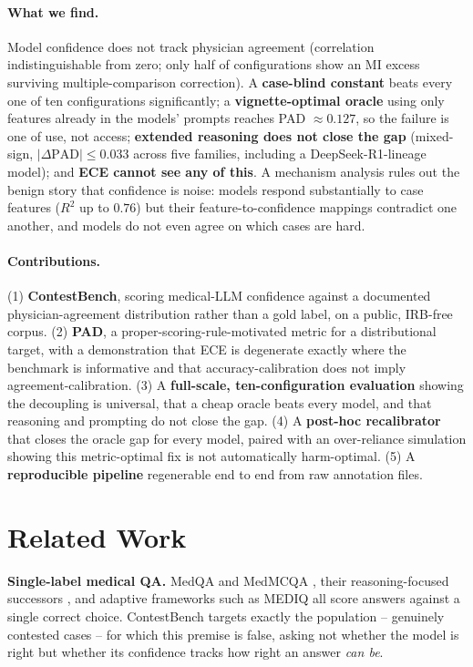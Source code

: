\documentclass[letterpaper]{article} %
\begin{document}
\paragraph{What we find.} Model confidence does not track physician
agreement (correlation indistinguishable from zero; only half of
configurations show an MI excess surviving multiple-comparison correction).
A \textbf{case-blind constant} beats every one of ten configurations
significantly; a \textbf{vignette-optimal oracle} using only features
already in the models' prompts reaches PAD $\approx 0.127$, so the failure is
one of use, not access; \textbf{extended reasoning does not close the gap}
(mixed-sign, $|\Delta\mathrm{PAD}|\le0.033$ across five families, including a
DeepSeek-R1-lineage model); and \textbf{ECE cannot see any of this}. A
mechanism analysis rules out the benign story that confidence is noise:
models respond substantially to case features ($R^2$ up to $0.76$) but their
feature-to-confidence mappings contradict one another, and models do not
even agree on which cases are hard.

\paragraph{Contributions.} (1) \textbf{ContestBench}, scoring medical-LLM
confidence against a documented physician-agreement distribution rather than
a gold label, on a public, IRB-free corpus. (2) \textbf{PAD}, a
proper-scoring-rule-motivated metric for a distributional target, with a
demonstration that ECE is degenerate exactly where the benchmark is
informative and that accuracy-calibration does not imply
agreement-calibration. (3) A \textbf{full-scale, ten-configuration
evaluation} showing the decoupling is universal, that a cheap oracle beats
every model, and that reasoning and prompting do not close the gap. (4) A
\textbf{post-hoc recalibrator} that closes the oracle gap for every model,
paired with an over-reliance simulation showing this metric-optimal fix is
not automatically harm-optimal. (5) A \textbf{reproducible pipeline}
regenerable end to end from raw annotation files.

\section{Related Work}

\textbf{Single-label medical QA.} MedQA \citep{jin2021medqa} and MedMCQA
\citep{pal2022medmcqa}, their reasoning-focused successors
\citep{medrbench2025,medthinkbench2025}, and adaptive frameworks such as
MEDIQ \citep{li2024mediq} all score answers against a single correct choice.
ContestBench targets exactly the population -- genuinely contested cases --
for which this premise is false, asking not whether the model is right but
whether its confidence tracks how right an answer \emph{can be}.
\end{document}
